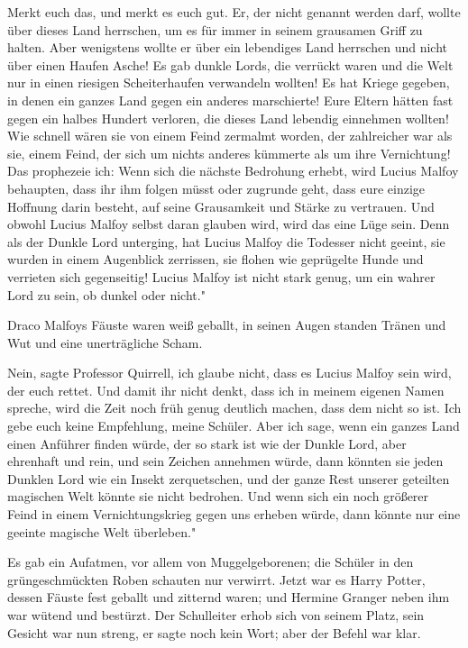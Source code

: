 \glqq Merkt euch das, und merkt es euch gut. Er, der nicht genannt werden darf,
wollte über dieses Land herrschen, um es für immer in seinem grausamen Griff zu
halten. Aber wenigstens wollte er über ein lebendiges Land herrschen und nicht
über einen Haufen Asche! Es gab dunkle Lords, die verrückt waren und die Welt
nur in einen riesigen Scheiterhaufen verwandeln wollten! Es hat Kriege gegeben,
in denen ein ganzes Land gegen ein anderes marschierte! Eure Eltern hätten fast
gegen ein halbes Hundert verloren, die dieses Land lebendig einnehmen wollten!
Wie schnell wären sie von einem Feind zermalmt worden, der zahlreicher war als
sie, einem Feind, der sich um nichts anderes kümmerte als um ihre Vernichtung!
Das prophezeie ich: Wenn sich die nächste Bedrohung erhebt, wird Lucius Malfoy
behaupten, dass ihr ihm folgen müsst oder zugrunde geht, dass eure einzige
Hoffnung darin besteht, auf seine Grausamkeit und Stärke zu vertrauen. Und
obwohl Lucius Malfoy selbst daran glauben wird, wird das eine Lüge sein. Denn
als der Dunkle Lord unterging, hat Lucius Malfoy die Todesser nicht geeint, sie
wurden in einem Augenblick zerrissen, sie flohen wie geprügelte Hunde und
verrieten sich gegenseitig! Lucius Malfoy ist nicht stark genug, um ein wahrer
Lord zu sein, ob dunkel oder nicht."

Draco Malfoys Fäuste waren weiß geballt, in seinen Augen standen Tränen und Wut
und eine unerträgliche Scham.

\glqq Nein\grqq{}, sagte Professor Quirrell, \glqq ich glaube nicht, dass es
Lucius Malfoy sein wird, der euch rettet. Und damit ihr nicht denkt, dass ich in
meinem eigenen Namen spreche, wird die Zeit noch früh genug deutlich machen,
dass dem nicht so ist. Ich gebe euch keine Empfehlung, meine Schüler. Aber ich
sage, wenn ein ganzes Land einen Anführer finden würde, der so stark ist wie der
Dunkle Lord, aber ehrenhaft und rein, und sein Zeichen annehmen würde, dann
könnten sie jeden Dunklen Lord wie ein Insekt zerquetschen, und der ganze Rest
unserer geteilten magischen Welt könnte sie nicht bedrohen. Und wenn sich ein
noch größerer Feind in einem Vernichtungskrieg gegen uns erheben würde, dann
könnte nur eine geeinte magische Welt überleben."

Es gab ein Aufatmen, vor allem von Muggelgeborenen; die Schüler in den
grüngeschmückten Roben schauten nur verwirrt. Jetzt war es Harry Potter, dessen
Fäuste fest geballt und zitternd waren; und Hermine Granger neben ihm war wütend
und bestürzt. Der Schulleiter erhob sich von seinem Platz, sein Gesicht war nun
streng, er sagte noch kein Wort; aber der Befehl war klar.

